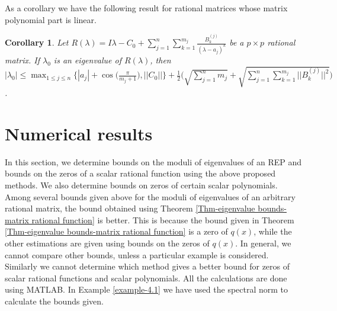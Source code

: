 \documentclass[12pt, reqno]{amsart}
\newtheorem{corollary}[theorem]{Corollary}
\theoremstyle{definition}
\theoremstyle{remark}
\numberwithin{equation}{section}
\begin{document}
\medskip
As a corollary we have the following result for rational matrices whose matrix 
polynomial part is linear.

\begin{corollary}\label{Cor-bound for eigenvalue-linear}
Let $R(\lambda) = I \lambda  - C_0 + \displaystyle \sum_{j=1}^{n} \sum_{k=1}^{m_j} 
\frac{B_k^{(j)}}{(\lambda-a_j)^k}$ be a $p\times p$ rational matrix. If 
$\lambda_0$ is an eigenvalue of $R(\lambda)$, then $|\lambda_0| \leq \displaystyle  
\max_{1\leq j \leq n} \Big\{|a_j| + \cos\bigg(\frac{\pi}{m_j+1}\bigg), ||C_0|| \Big\} + 
\frac{1}{2} \Bigg( \sqrt{\sum _{j=1}^{n}m_j} + \sqrt{\sum_{j=1}^{n} 
\sum_{k=1}^{m_j}||B_k^{(j)}||^{2}} \Bigg)$.
\end{corollary}

\medskip
\section{Numerical results}\label{sec-4}\hspace*{\fill}
 
In this section, we determine bounds on the moduli of eigenvalues of an 
REP and bounds on the zeros of a scalar rational function using the above proposed 
methods. We also determine bounds on zeros of certain scalar polynomials. Among 
several bounds given above for the moduli of eigenvalues of an arbitrary rational 
matrix, the bound obtained using Theorem \ref{Thm-eigenvalue bounds-matrix rational function} 
is better. This is because the bound given in Theorem 
\ref{Thm-eigenvalue bounds-matrix rational function} is a zero of $q(x)$, 
while the other estimations are given using bounds on the zeros of $q(x)$. In 
general, we cannot compare other bounds, unless a particular example is considered. 
Similarly we cannot determine which method gives a better bound for zeros of scalar 
rational functions and scalar polynomials. All the calculations are done using MATLAB. 
In Example \ref{example-4.1} we have used the spectral norm to calculate the bounds given.   
\end{document}
